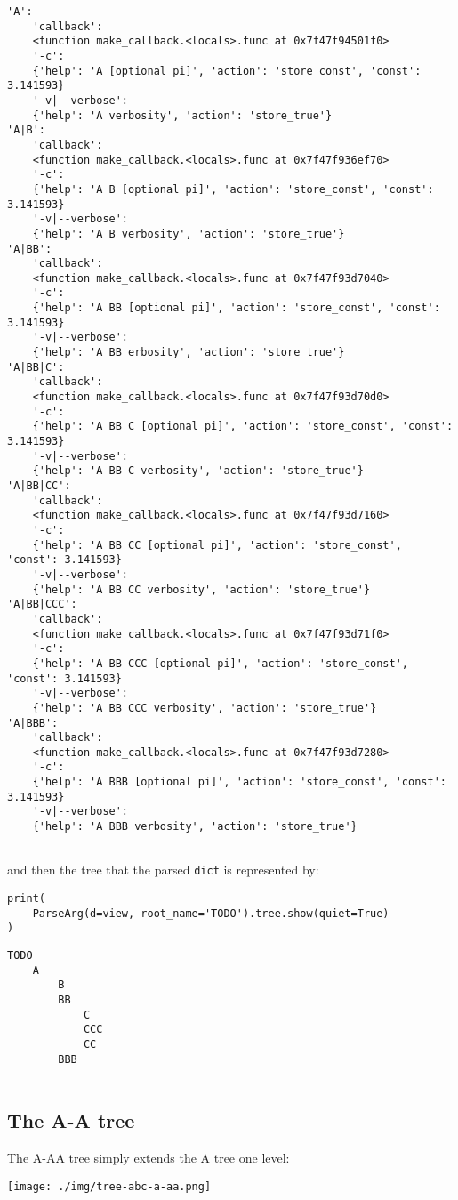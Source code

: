 \documentclass[10pt]{amsart}
\numberwithin{equation}{section}
\begin{document}
\begin{verbatim}
'A':
    'callback':
    <function make_callback.<locals>.func at 0x7f47f94501f0>
    '-c':
    {'help': 'A [optional pi]', 'action': 'store_const', 'const': 3.141593}
    '-v|--verbose':
    {'help': 'A verbosity', 'action': 'store_true'}
'A|B':
    'callback':
    <function make_callback.<locals>.func at 0x7f47f936ef70>
    '-c':
    {'help': 'A B [optional pi]', 'action': 'store_const', 'const': 3.141593}
    '-v|--verbose':
    {'help': 'A B verbosity', 'action': 'store_true'}
'A|BB':
    'callback':
    <function make_callback.<locals>.func at 0x7f47f93d7040>
    '-c':
    {'help': 'A BB [optional pi]', 'action': 'store_const', 'const': 3.141593}
    '-v|--verbose':
    {'help': 'A BB erbosity', 'action': 'store_true'}
'A|BB|C':
    'callback':
    <function make_callback.<locals>.func at 0x7f47f93d70d0>
    '-c':
    {'help': 'A BB C [optional pi]', 'action': 'store_const', 'const': 3.141593}
    '-v|--verbose':
    {'help': 'A BB C verbosity', 'action': 'store_true'}
'A|BB|CC':
    'callback':
    <function make_callback.<locals>.func at 0x7f47f93d7160>
    '-c':
    {'help': 'A BB CC [optional pi]', 'action': 'store_const', 'const': 3.141593}
    '-v|--verbose':
    {'help': 'A BB CC verbosity', 'action': 'store_true'}
'A|BB|CCC':
    'callback':
    <function make_callback.<locals>.func at 0x7f47f93d71f0>
    '-c':
    {'help': 'A BB CCC [optional pi]', 'action': 'store_const', 'const': 3.141593}
    '-v|--verbose':
    {'help': 'A BB CCC verbosity', 'action': 'store_true'}
'A|BBB':
    'callback':
    <function make_callback.<locals>.func at 0x7f47f93d7280>
    '-c':
    {'help': 'A BBB [optional pi]', 'action': 'store_const', 'const': 3.141593}
    '-v|--verbose':
    {'help': 'A BBB verbosity', 'action': 'store_true'}


\end{verbatim}
and then the tree that the parsed \texttt{dict} is represented by:
\begin{verbatim}
print(
    ParseArg(d=view, root_name='TODO').tree.show(quiet=True)
)
\end{verbatim}

\begin{verbatim}
TODO
    A
        B
        BB
            C
            CCC
            CC
        BBB


\end{verbatim}

\subsection{The A-A tree}
\label{sec:orgec8d015}
The A-AA tree simply extends the A tree one level:
\begin{center}
\texttt{[image: ./img/tree-abc-a-aa.png]}
\end{center}
\end{document}

